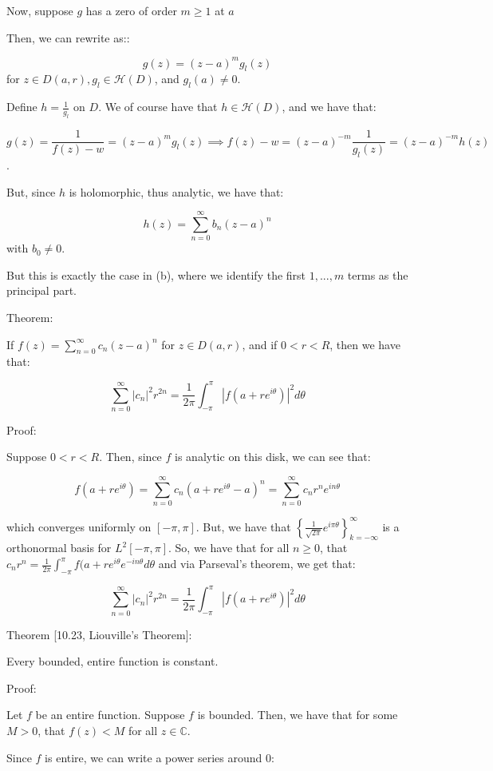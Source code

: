 \documentclass[10pt]{article}
\newcommand{\calH}{\mathcal{H}}
\begin{document}
Now, suppose $g$ has a zero of order $m \geq 1$ at $a$

Then, we can rewrite as::

$$g(z) = (z-a)^m g_l(z) $$ for $z \in D(a,r), g_l \in \calH(D)$, and $g_l(a) \not = 0$.

Define $h = \frac{1}{g_l}$ on $D$. We of course have that $h \in \calH(D)$, and we have that:

$$ g(z) = \frac{1}{f(z) - w} = (z-a)^m g_l(z) \implies f(z) - w = (z-a)^{-m} \frac{1}{g_l(z)} =  (z-a)^{-m} h(z)$$.

But, since $h$ is holomorphic, thus analytic, we have that:

$$h(z) = \sum_{n=0}^\infty b_n (z-a)^n$$ with $b_0 \not = 0$.

But this is exactly the case in (b), where we identify the first $1,...,m$ terms as the principal part.

Theorem:

If $f(z) = \sum_{n=0}^\infty c_n (z-a)^n$ for $z \in D(a,r)$, and if $0 < r < R$, then we have that:

$$ \sum_{n=0}^\infty |c_n|^2 r^{2n} = \frac{1}{2\pi} \int_{-\pi}^\pi | f(a + re^{i\theta})|^2 d\theta $$

Proof:

Suppose $0 < r < R$. Then, since $f$ is analytic on this disk, we can see that:

$$f(a + re^{i\theta}) = \sum_{n=0}^\infty c_n (a + re^{i\theta} - a)^n = \sum_{n=0}^\infty c_n r^n e^{in\theta}$$

which converges uniformly on $[-\pi, \pi]$. But, we have that $\left\{ \frac{1}{\sqrt{2\pi}} e^{i \pi \theta } \right\}_{k=-\infty}^\infty$ is a orthonormal basis for $L^2[-\pi,\pi]$. So, we have that for all $n \geq 0$, that $c_n r^n = \frac{1}{2\pi} \int_{-\pi}^\pi f(a + re^{i\theta} e^{-in \theta} d\theta$ and via Parseval’s theorem, we get that:

$$ \sum_{n=0}^\infty | c_n|^2 r^{2n} = \frac{1}{2\pi} \int_{-\pi}^\pi |f(a + r e^{i\theta})|^2 d\theta$$

Theorem [10.23, Liouville’s Theorem]:

Every bounded, entire function is constant.

Proof:

Let $f$ be an entire function. Suppose $f$ is bounded. Then, we have that for some $M > 0$, that $f(z) < M$ for all $z \in \mathbb{C}$.

Since $f$ is entire, we can write a power series around $0$:
\end{document}

